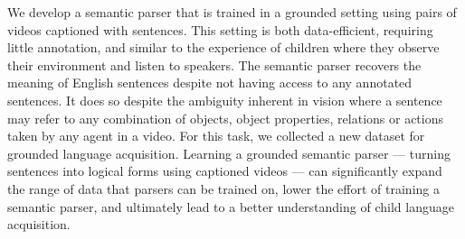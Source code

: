 We develop a semantic parser that is trained in a grounded setting using pairs of videos captioned with sentences. This setting is both data-efficient, requiring little annotation, and similar to the experience of children where they observe their environment and listen to speakers. The semantic parser recovers the meaning of English sentences despite not having access to any annotated sentences. It does so despite the ambiguity inherent in vision where a sentence may refer to any combination of objects, object properties, relations or actions taken by any agent in a video. For this task, we collected a new dataset for grounded language acquisition. Learning a grounded semantic parser — turning sentences into logical forms using captioned videos — can significantly expand the range of data that parsers can be trained on, lower the effort of training a semantic parser, and ultimately lead to a better understanding of child language acquisition.
